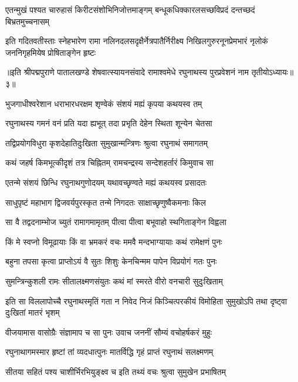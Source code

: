 \twolineshloka
{एतन्मुखं पश्यत चारुहासं किरीटसंशोभिनिजोत्तमाङ्गम्}
{बन्धूकधिक्कारलसच्छविप्रदं दन्तच्छदं बिभ्रतमुच्चनासम्}%

\twolineshloka
{इति गदितवतीस्ताः स्नेहभारेण रामा नलिनदलसदृक्षैर्नेत्रपातैर्निरीक्ष्य}
{निखिलगुरुरनूनप्रेमभारं नृलोकं जननिगृहमियेष प्रोषिताङ्गेन हृष्टः}%

{॥इति श्रीपद्मपुराणे पातालखण्डे शेषवात्स्यायनसंवादे रामाश्वमेधे रघुनाथस्य पुरप्रवेशनं नाम तृतीयोऽध्यायः॥३॥}

\resetShloka


\twolineshloka
{भुजगाधीश्वरेशान धराभारधरक्षम}
{शृण्वेकं संशयं मह्यं कृपया कथयस्व तम्}%

\twolineshloka
{रघुनाथस्य गमनं वनं प्रति यदा ह्यभूत्}
{तदा प्रभृति देहेन स्थिता शून्येन चेतसा}%

\twolineshloka
{तद्विप्रयोगविधुरा कृशदेहातिदुःखिता}
{सुमुखान्मन्त्रिणः श्रुत्वा रघुनाथं समागतम्}%

\twolineshloka
{कथं जहर्ष किमभूत्कीदृशं तत्र चिह्नितम्}
{रामचन्द्रस्य सन्देशहर्तारं किमुवाच सा}%

\twolineshloka
{एतन्मे संशयं छिन्धि रघुनाथगुणोदयम्}
{यथावच्छृण्वते मह्यं कथयस्व प्रसादतः}%


\twolineshloka
{साधुपृष्टं महाभाग द्विजवर्यपुरस्कृत}
{तन्मे निगदतः साक्षाच्छृणुष्वैकमनाः किल}%

\twolineshloka
{सा वै तद्वदनाम्भोज च्युतं रामागमामृतम्}
{पीत्वा पीत्वा बभूवाहो स्थगिताङ्गेन विह्वला}%

\twolineshloka
{किं मे स्वप्नो विमूढायाः किं वा भ्रमकरं वचः}
{ममवै मन्दभाग्यायाः कथं रामेक्षणं पुनः}%

\twolineshloka
{बहुना तपसा कृत्वा प्राप्तोऽयं वै सुतः शिशुः}
{केनचिन्मम पापेन विप्रयोगं गतः पुनः}%

\twolineshloka
{सुमन्त्रिन्कुशली रामः सीतालक्ष्मणसंयुतः}
{कथं मां स्मरते वीरो वनचारी सुदुःखिताम्}%


\threelineshloka
{इति सा विललापोच्चै रघुनाथस्मृतिं गता}
{न निवेद निजं किञ्चित्परकीयं विमोहिता}
{सुमुखोऽपि तथा दृष्ट्वा दुःखितां मातरं भृशम्}%

\twolineshloka
{वीजयामास वासोग्रैः संज्ञामाप च सा पुनः}
{उवाच जननीं सौम्यं वचोहर्षकरं मुहुः}%

\twolineshloka
{रघुनाथागमस्मार हृष्टां तां व्यदधात्पुनः}
{मातर्विद्धि गृहं प्राप्तं रघुनाथं सलक्ष्मणम्}%

\twolineshloka
{सीतया सहितं पश्य चाशीर्भिरभियुङ्क्ष्व च}
{इति तथ्यं वचः श्रुत्वा सुमुखेन प्रभाषितम्}%

